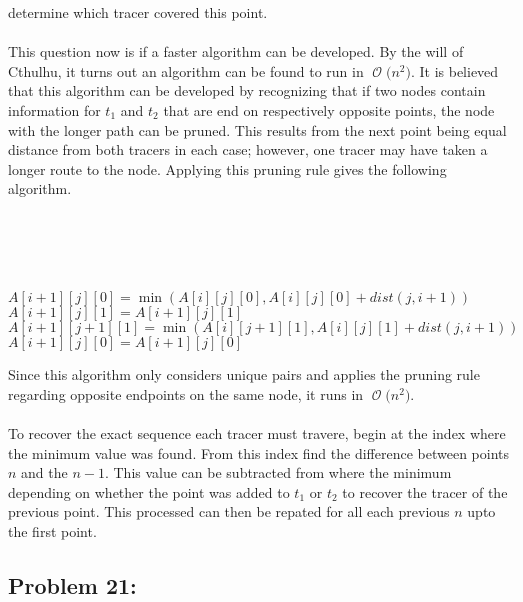 \documentclass[12pt]{article}
\newcommand{\BigO}[1]{\ensuremath{\operatorname{\mathcal{O}}\bigl(#1\bigr)}}
\begin{document}
determine which tracer covered this point.\\\\
This question now is if a faster algorithm can be developed.
By the will of Cthulhu, it turns out an algorithm can be
found to run in \BigO{n^2}.
It is believed that this algorithm can be developed by recognizing that
if two nodes contain information for $t_1$ and $t_2$ that are
end on respectively opposite points, the node with the longer
path can be pruned.  This results from the next point being
equal distance from both tracers in each case; however,
one tracer may have taken a longer route to the node.  Applying
this pruning rule gives the following algorithm.\\\\
\begin{algorithm}[H]
\\
\\
\\
 {
     {
         {
            $A[i+1][j][0] = \min(A[i][j][0], A[i][j][0] + dist(j,i+1))$\\
            $A[i+1][j][1] = A[i+1][j][1]$\\
            $A[i+1][j+1][1] = \min(A[i][j+1][1], A[i][j][1] + dist(j,i+1))$\\
            $A[i+1][j][0] = A[i+1][j][0]$\\
        }
    }
}
\end{algorithm}
Since this algorithm only considers unique pairs and applies the pruning
rule regarding opposite endpoints on the same node, it runs in \BigO{n^2}.\\\\
To recover the exact sequence each tracer must travere, begin at the 
index where the minimum value was found. From this index find the difference
between points $n$ and the $n-1$.  This value can be subtracted from where the
minimum depending on whether the point was added to $t_1$ or $t_2$ to recover
the tracer of the previous point.  This processed can then be repated for all
each previous $n$ upto the first point.   
\subsection*{Problem 21: }
\end{document}
